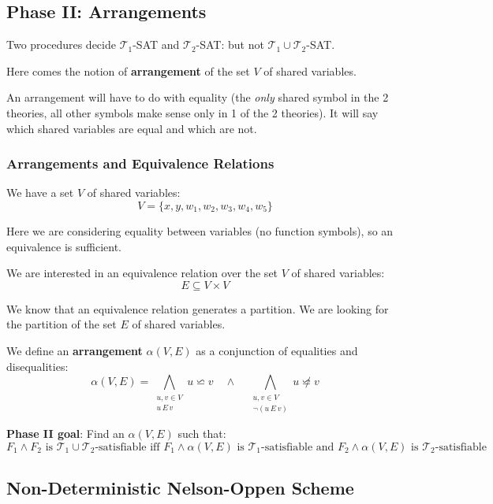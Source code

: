 \documentclass[11pt,a4paper]{article}
\theoremstyle{definition}
\theoremstyle{plain}
\theoremstyle{remark}
\begin{document}
\subsection{Phase II: Arrangements}

Two procedures decide $\mathcal{T}_1$-SAT and $\mathcal{T}_2$-SAT: but not $\mathcal{T}_1 \cup \mathcal{T}_2$-SAT.

Here comes the notion of \textbf{arrangement} of the set $V$ of shared variables.

An arrangement will have to do with equality (the \textit{only} shared symbol in the 2 theories, all other symbols make sense only in 1 of the 2 theories). It will say which shared variables are equal and which are not.

\subsubsection{Arrangements and Equivalence Relations}

We have a set $V$ of shared variables:
\[
V = \{x, y, w_1, w_2, w_3, w_4, w_5\}
\]

Here we are considering equality between variables (no function symbols), so an equivalence is sufficient.

We are interested in an equivalence relation over the set $V$ of shared variables:
\[
E \subseteq V \times V
\]

We know that an equivalence relation generates a partition. We are looking for the partition of the set $E$ of shared variables.

\begin{tcolorbox}[colback=teal!10!white,colframe=teal!75!black,title=\textbf{Arrangement Definition}]
We define an \textbf{arrangement} $\alpha(V, E)$ as a conjunction of equalities and disequalities:
\[
\alpha(V, E) = \bigwedge_{\substack{u, v \in V \\ u \, E \, v}} u \backsimeq v \quad \wedge \quad \bigwedge_{\substack{u, v \in V \\ \neg(u \, E \, v)}} u \not\backsimeq v
\]
\end{tcolorbox}

\textbf{Phase II goal}: Find an $\alpha(V, E)$ such that:
\[
F_1 \wedge F_2 \text{ is } \mathcal{T}_1 \cup \mathcal{T}_2\text{-satisfiable iff } F_1 \wedge \alpha(V, E) \text{ is } \mathcal{T}_1\text{-satisfiable and } F_2 \wedge \alpha(V, E) \text{ is } \mathcal{T}_2\text{-satisfiable}
\] 

\subsection{Non-Deterministic Nelson-Oppen Scheme}
\end{document}
